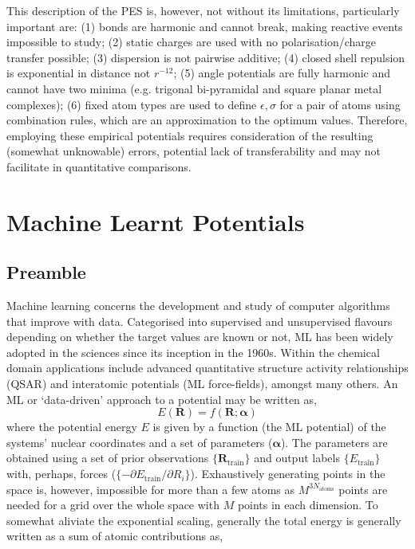 \documentclass[main.tex]{subfiles}
\begin{document}
This description of the PES is, however, not without its limitations, particularly important are: (1) bonds are harmonic and cannot break, making reactive events impossible to study; (2) static charges are used with no polarisation/charge transfer possible; (3) dispersion is not pairwise additive; (4) closed shell repulsion is exponential in distance not $r^{-12}$; (5) angle potentials are fully harmonic and cannot have two minima (e.g. trigonal bi-pyramidal and square planar metal complexes); (6) fixed atom types are used to define $\epsilon, \sigma$ for a pair of atoms using combination rules, which are an approximation to the optimum values.\cite{Boda2008} Therefore, employing these empirical potentials requires consideration of the resulting (somewhat unknowable) errors, potential lack of transferability and may not facilitate in quantitative comparisons.\cite{Harrison2018, LewisAtwell2021}


\section{Machine Learnt Potentials}
\subsection{Preamble}

Machine learning concerns the development and study of computer algorithms that improve with data.\cite{Mitchell1997} Categorised into supervised and unsupervised flavours depending on whether the target values are known or not, ML has been widely adopted in the sciences since its inception in  the 1960s.\cite{Carleo2019} Within the chemical domain applications include advanced quantitative structure activity relationships (QSAR) and interatomic potentials (ML force-fields), amongst many others.\cite{Cova2019} An ML or `data-driven' approach to a potential may be written as,
\begin{equation}
	E(\boldsymbol{R}) = f(\boldsymbol{R}; \boldsymbol{\alpha})
\end{equation}
where the potential energy $E$ is given by a function (the ML potential) of the systems' nuclear coordinates and a set of parameters ($\boldsymbol{\alpha}$). The parameters are obtained using a set of prior observations $\{\boldsymbol{R}_\text{train}\}$ and output labels $\{E_\text{train}\}$ with, perhaps, forces ($\{-\partial E_\text{train}/\partial R_i\}$). Exhaustively generating points in the space is, however, impossible for more than a few atoms as $M^{3N_\text{atoms}}$ points are needed for a grid over the whole space with $M$ points in each dimension. To somewhat aliviate the exponential scaling, generally the total energy is generally written as a sum of atomic contributions as,
\end{document}
